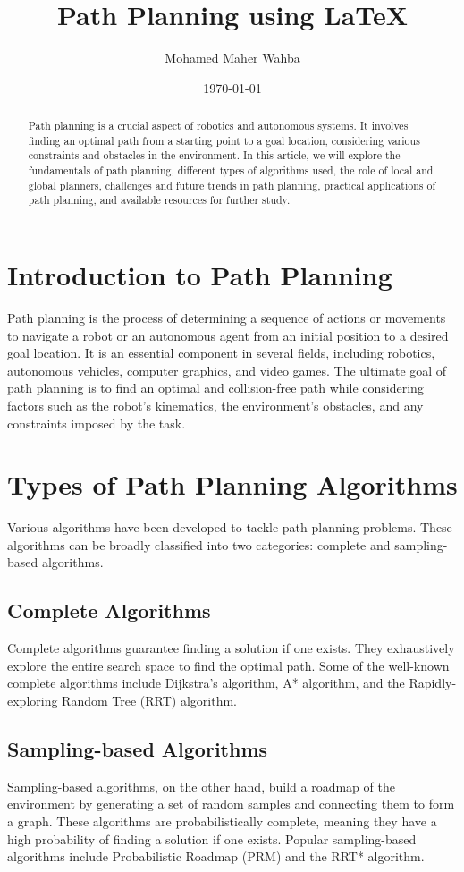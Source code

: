\documentclass{article}
\title{Path Planning using \LaTeX}
\author{Mohamed Maher Wahba}
\date{\today}
\begin{document}
\maketitle

\begin{abstract}
Path planning is a crucial aspect of robotics and autonomous systems. It involves finding an optimal path from a starting point to a goal location, considering various constraints and obstacles in the environment. In this article, we will explore the fundamentals of path planning, different types of algorithms used, the role of local and global planners, challenges and future trends in path planning, practical applications of path planning, and available resources for further study.
\end{abstract}

\section{Introduction to Path Planning}
Path planning is the process of determining a sequence of actions or movements to navigate a robot or an autonomous agent from an initial position to a desired goal location. It is an essential component in several fields, including robotics, autonomous vehicles, computer graphics, and video games. The ultimate goal of path planning is to find an optimal and collision-free path while considering factors such as the robot's kinematics, the environment's obstacles, and any constraints imposed by the task.

\section{Types of Path Planning Algorithms}
Various algorithms have been developed to tackle path planning problems. These algorithms can be broadly classified into two categories: complete and sampling-based algorithms.

\subsection{Complete Algorithms}
Complete algorithms guarantee finding a solution if one exists. They exhaustively explore the entire search space to find the optimal path. Some of the well-known complete algorithms include Dijkstra's algorithm, A* algorithm, and the Rapidly-exploring Random Tree (RRT) algorithm.

\subsection{Sampling-based Algorithms}
Sampling-based algorithms, on the other hand, build a roadmap of the environment by generating a set of random samples and connecting them to form a graph. These algorithms are probabilistically complete, meaning they have a high probability of finding a solution if one exists. Popular sampling-based algorithms include Probabilistic Roadmap (PRM) and the RRT* algorithm.
\end{document}
